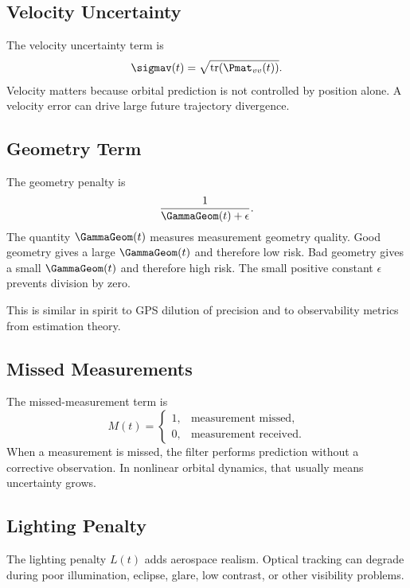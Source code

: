 \documentclass[11pt]{article}
\begin{document}
\subsection{Velocity Uncertainty}

The velocity uncertainty term is
\begin{equation}
  \sigmav(t) = \sqrt{\operatorname{tr}(\Pmat_{vv}(t))}.
\end{equation}
Velocity matters because orbital prediction is not controlled by position
alone. A velocity error can drive large future trajectory divergence.

\subsection{Geometry Term}

The geometry penalty is
\begin{equation}
  \frac{1}{\GammaGeom(t)+\epsilon}.
\end{equation}
The quantity $\GammaGeom(t)$ measures measurement geometry quality. Good
geometry gives a large $\GammaGeom(t)$ and therefore low risk. Bad geometry
gives a small $\GammaGeom(t)$ and therefore high risk. The small positive
constant $\epsilon$ prevents division by zero.

This is similar in spirit to GPS dilution of precision and to observability
metrics from estimation theory.

\subsection{Missed Measurements}

The missed-measurement term is
\begin{equation}
  M(t)
  =
  \begin{cases}
    1, & \text{measurement missed},\\
    0, & \text{measurement received}.
  \end{cases}
\end{equation}
When a measurement is missed, the filter performs prediction without a
corrective observation. In nonlinear orbital dynamics, that usually means
uncertainty grows.

\subsection{Lighting Penalty}

The lighting penalty $L(t)$ adds aerospace realism. Optical tracking can
degrade during poor illumination, eclipse, glare, low contrast, or other
visibility problems.
\end{document}

